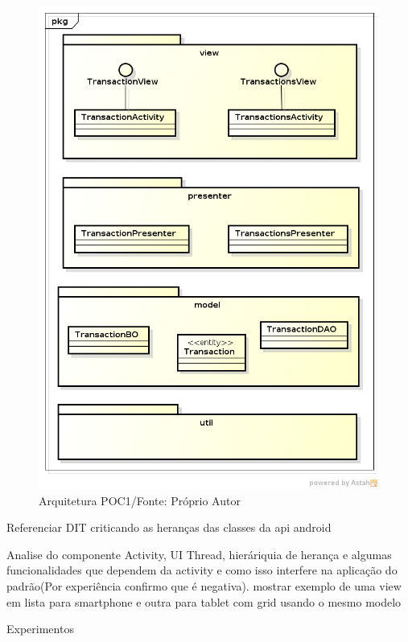 \begin{figure}[h]
	\centering
	\includegraphics[scale=0.5]{img/arq_poc1.png}
	\caption{Arquitetura POC1/Fonte: Próprio Autor}
	\label{arq_poc1}
\end{figure}



\if
Referenciar DIT criticando as heranças das classes da api android

Analise do componente Activity, UI Thread, hieráriquia de herança e algumas
funcionalidades que dependem da activity e como isso interfere na aplicação do
padrão(Por experiência confirmo que é negativa). mostrar exemplo de uma view em
lista para smartphone e outra para tablet com grid usando o mesmo modelo


Experimentos


